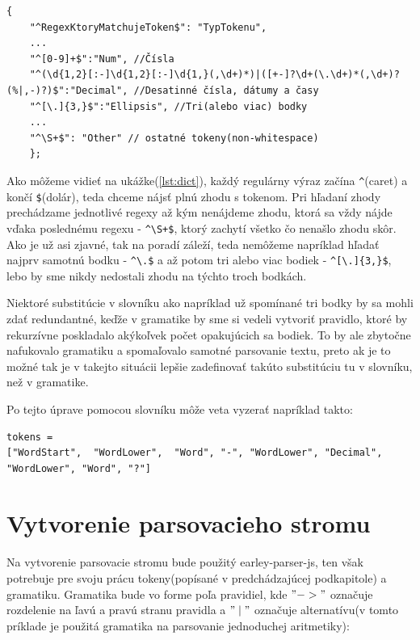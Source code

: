 \documentclass[12pt,a4paper]{report}
\theoremstyle{definition}
\theoremstyle{remark}
\begin{document}
\begin{lstlisting}[caption={Formát slovníku a príklad substitúcie},label={lst:dict},style=htmlcssjs]
	{
	"^RegexKtoryMatchujeToken$": "TypTokenu",
	...
	"^[0-9]+$":"Num", //Čísla
	"^(\d{1,2}[:-]\d{1,2}[:-]\d{1,}(,\d+)*)|([+-]?\d+(\.\d+)*(,\d+)?(%|,-)?)$":"Decimal", //Desatinné čísla, dátumy a časy
	"^[\.]{3,}$":"Ellipsis", //Tri(alebo viac) bodky
	...
	"^\S+$": "Other" // ostatné tokeny(non-whitespace)
	};
\end{lstlisting}
\bigskip
Ako môžeme vidieť na ukážke(\ref{lst:dict}), každý regulárny výraz začína \verb!^!(caret) a končí \verb!$!(dolár), teda chceme nájsť plnú zhodu s tokenom. Pri hľadaní zhody prechádzame jednotlivé regexy až kým nenájdeme zhodu, ktorá sa vždy nájde vďaka poslednému regexu - \verb!^\S+$!, ktorý zachytí všetko čo nenašlo zhodu skôr. Ako je už asi zjavné, tak na poradí záleží, teda nemôžeme napríklad hľadať najprv samotnú bodku - \verb!^\.$! a až potom tri alebo viac bodiek -  \verb!^[\.]{3,}$!, lebo by sme nikdy nedostali zhodu na týchto troch bodkách.

 Niektoré substitúcie v slovníku ako napríklad už spomínané tri bodky by sa mohli zdať redundantné, keďže v gramatike by sme si vedeli vytvoriť pravidlo, ktoré by rekurzívne poskladalo akýkoľvek počet opakujúcich sa bodiek. To by ale zbytočne nafukovalo gramatiku a spomaľovalo samotné parsovanie textu, preto ak je to možné tak je v takejto situácii lepšie zadefinovať takúto substitúciu tu v slovníku, než v gramatike. 
 
 
\bigskip


\noindent Po tejto úprave pomocou slovníku môže veta vyzerať napríklad takto:
\begin{lstlisting}[caption={Tokeny po použití slovníku},style=htmlcssjs]
tokens = 
["WordStart",  "WordLower",  "Word", "-", "WordLower", "Decimal", "WordLower", "Word", "?"]
\end{lstlisting}

\section{Vytvorenie parsovacieho stromu}
Na vytvorenie parsovacie stromu bude použitý earley-parser-js, ten však potrebuje pre svoju prácu tokeny(popísané v predchádzajúcej podkapitole) a gramatiku. Gramatika bude vo forme poľa pravidiel, kde $" ->"$ označuje rozdelenie na ľavú a pravú stranu pravidla a $"\mid"$ označuje alternatívu(v tomto príklade je použitá gramatika na parsovanie jednoduchej aritmetiky):
\end{document}
